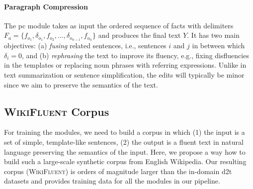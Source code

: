 \paragraph{Paragraph Compression}  The \ac{pc} module takes as input the ordered sequence of facts with delimiters $F_a = \{f_{o_1}, \delta_{o_1}, f_{o_2}, \ldots, \delta_{o_{n-1}}, f_{o_n}\}$ and produces the final text $Y$.  It has two main objectives: (a) \textit{fusing} related sentences, i.e., sentences $i$ and $j$ in between which $\delta_{i}=0$, and (b) \textit{rephrasing} the text to improve its fluency, e.g., fixing disfluencies in the templates or replacing noun phrases with referring expressions. Unlike in text summarization or sentence simplification, the edits will typically be minor since we aim to preserve the semantics of the text.



\subsection{\textsc{WikiFluent} Corpus}
\label{sec:pipeline:wikifluent}
For training the modules, we need to build a corpus in which (1) the input is a set of simple, template-like sentences, (2) the output is a fluent text in natural language preserving the semantics of the input. Here, we propose a way how to build such a large-scale synthetic corpus from English Wikipedia. Our resulting corpus (\textsc{WikiFluent}) is orders of magnitude larger than the in-domain \ac{d2t} datasets and provides training data for all the modules in our pipeline.


